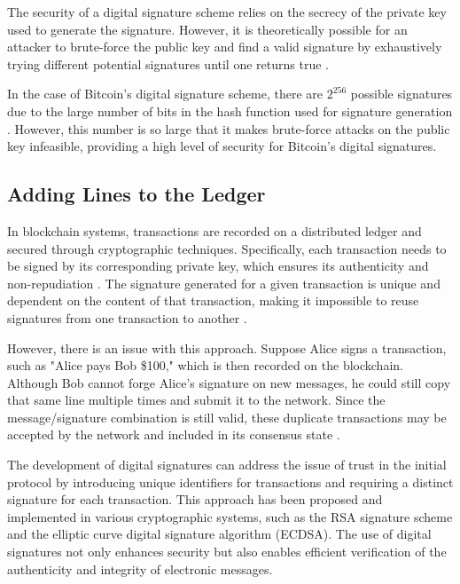 The security of a digital signature scheme relies on the secrecy of the private key used to generate the signature. However, it is theoretically possible for an attacker to brute-force the public key and find a valid signature by exhaustively trying different potential signatures until one returns true \cite{boneh2001short}.

In the case of Bitcoin's digital signature scheme, there are $2^256$ possible signatures due to the large number of bits in the hash function used for signature generation \cite{dss}. However, this number is so large that it makes brute-force attacks on the public key infeasible, providing a high level of security for Bitcoin's digital signatures.

\subsection{Adding Lines to the Ledger}
In blockchain systems, transactions are recorded on a distributed ledger and secured through cryptographic techniques. Specifically, each transaction needs to be signed by its corresponding private key, which ensures its authenticity and non-repudiation \cite{stinson2018cryptography}. The signature generated for a given transaction is unique and dependent on the content of that transaction, making it impossible to reuse signatures from one transaction to another \cite{bruce1996applied}.

However, there is an issue with this approach. Suppose Alice signs a transaction, such as "Alice pays Bob \$100," which is then recorded on the blockchain. Although Bob cannot forge Alice's signature on new messages, he could still copy that same line multiple times and submit it to the network. Since the message/signature combination is still valid, these duplicate transactions may be accepted by the network and included in its consensus state \cite{swan2015blockchain}.

%

The development of digital signatures can address the issue of trust in the initial protocol by introducing unique identifiers for transactions and requiring a distinct signature for each transaction. This approach has been proposed and implemented in various cryptographic systems, such as the RSA signature scheme \cite{rivest1978method} and the elliptic curve digital signature algorithm (ECDSA). The use of digital signatures not only enhances security but also enables efficient verification of the authenticity and integrity of electronic messages.

